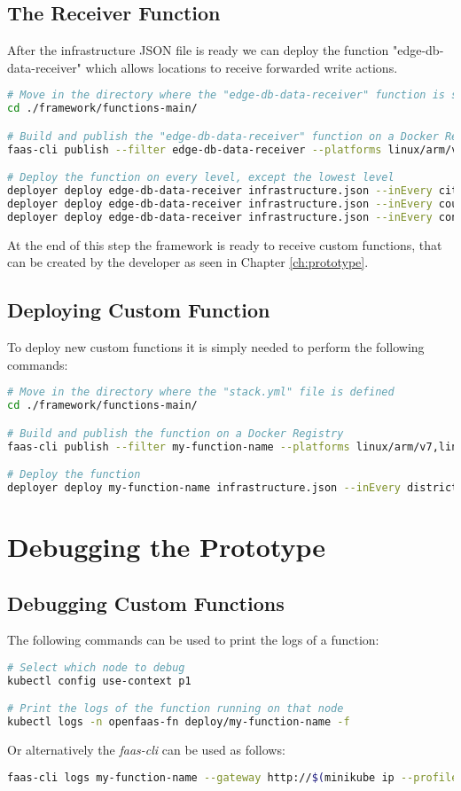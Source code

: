 \subsection{The Receiver Function}
After the infrastructure JSON file is ready we can deploy the function "edge-db-data-receiver" which allows locations to receive forwarded write actions.
\begin{lstlisting}[language=bash]
# Move in the directory where the "edge-db-data-receiver" function is stored
cd ./framework/functions-main/

# Build and publish the "edge-db-data-receiver" function on a Docker Registry
faas-cli publish --filter edge-db-data-receiver --platforms linux/arm/v7,linux/amd64

# Deploy the function on every level, except the lowest level
deployer deploy edge-db-data-receiver infrastructure.json --inEvery city
deployer deploy edge-db-data-receiver infrastructure.json --inEvery country
deployer deploy edge-db-data-receiver infrastructure.json --inEvery continent
\end{lstlisting}
At the end of this step the framework is ready to receive custom functions, that can be created by the developer as seen in Chapter \ref{ch:prototype}. 


\subsection{Deploying Custom Function}
To deploy new custom functions it is simply needed to perform the following commands:
\begin{lstlisting}[language=bash]
# Move in the directory where the "stack.yml" file is defined
cd ./framework/functions-main/

# Build and publish the function on a Docker Registry
faas-cli publish --filter my-function-name --platforms linux/arm/v7,linux/amd64

# Deploy the function
deployer deploy my-function-name infrastructure.json --inEvery district --inAreas italy paris --exceptIn milan
\end{lstlisting}


\section{Debugging the Prototype}

\subsection{Debugging Custom Functions}
The following commands can be used to print the logs of a function:
\begin{lstlisting}[language=bash]
# Select which node to debug
kubectl config use-context p1

# Print the logs of the function running on that node
kubectl logs -n openfaas-fn deploy/my-function-name -f
\end{lstlisting}
Or alternatively the \textit{faas-cli} can be used as follows:
\begin{lstlisting}[language=bash]
faas-cli logs my-function-name --gateway http://$(minikube ip --profile p1):31112
\end{lstlisting}


